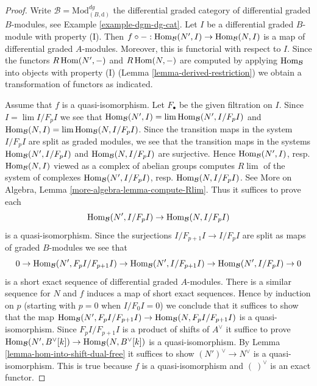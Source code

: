\begin{proof}
Write $\mathcal{B} = \text{Mod}^{dg}_{(B, \text{d})}$ the
differential graded category of differential graded $B$-modules, see
Example \ref{example-dgm-dg-cat}.
Let $I$ be a differential graded $B$-module with property (I).
Then $f \circ - : \mathop{\mathrm{Hom}}\nolimits_\mathcal{B}(N', I) \to \mathop{\mathrm{Hom}}\nolimits_\mathcal{B}(N, I)$
is a map of differential graded $A$-modules. Moreover, this is functorial
with respect to $I$. Since the functors
$ R\mathop{\mathrm{Hom}}\nolimits(N', -)$ and $R\mathop{\mathrm{Hom}}\nolimits(N, -)$ are
computed by applying $\mathop{\mathrm{Hom}}\nolimits_\mathcal{B}$ into objects with property (I)
(Lemma \ref{lemma-derived-restriction}) we obtain a transformation of functors
as indicated.

\medskip\noindent
Assume that $f$ is a quasi-isomorphism. Let $F_\bullet$ be the
given filtration on $I$. Since $I = \lim I/F_pI$ we see that
$\mathop{\mathrm{Hom}}\nolimits_\mathcal{B}(N', I) = \mathop{\mathrm{lim}}\nolimits \mathop{\mathrm{Hom}}\nolimits_\mathcal{B}(N', I/F_pI)$ and
$\mathop{\mathrm{Hom}}\nolimits_\mathcal{B}(N, I) = \mathop{\mathrm{lim}}\nolimits \mathop{\mathrm{Hom}}\nolimits_\mathcal{B}(N, I/F_pI)$.
Since the transition maps in the system $I/F_pI$ are split
as graded modules, we see that the transition maps in the
systems $\mathop{\mathrm{Hom}}\nolimits_\mathcal{B}(N', I/F_pI)$ and $\mathop{\mathrm{Hom}}\nolimits_\mathcal{B}(N, I/F_pI)$
are surjective. Hence $\mathop{\mathrm{Hom}}\nolimits_\mathcal{B}(N', I)$, resp. $\mathop{\mathrm{Hom}}\nolimits_\mathcal{B}(N, I)$
viewed as a complex of abelian groups computes $R\lim$ of the system
of complexes
$\mathop{\mathrm{Hom}}\nolimits_\mathcal{B}(N', I/F_pI)$, resp. $\mathop{\mathrm{Hom}}\nolimits_\mathcal{B}(N, I/F_pI)$.
See More on Algebra, Lemma \ref{more-algebra-lemma-compute-Rlim}.
Thus it suffices to prove each
$$
\mathop{\mathrm{Hom}}\nolimits_\mathcal{B}(N', I/F_pI) \to \mathop{\mathrm{Hom}}\nolimits_\mathcal{B}(N, I/F_pI)
$$
is a quasi-isomorphism. Since the surjections $I/F_{p + 1}I \to I/F_pI$
are split as maps of graded $B$-modules we see that
$$
0 \to \mathop{\mathrm{Hom}}\nolimits_\mathcal{B}(N', F_pI/F_{p + 1}I) \to
\mathop{\mathrm{Hom}}\nolimits_\mathcal{B}(N', I/F_{p + 1}I) \to
\mathop{\mathrm{Hom}}\nolimits_\mathcal{B}(N', I/F_pI) \to 0
$$
is a short exact sequence of differential graded $A$-modules.
There is a similar sequence for $N$ and $f$ induces a map
of short exact sequences. Hence by induction on $p$ (starting with $p = 0$
when $I/F_0I = 0$) we conclude that it suffices to show that
the map
$\mathop{\mathrm{Hom}}\nolimits_\mathcal{B}(N', F_pI/F_{p + 1}I) \to \mathop{\mathrm{Hom}}\nolimits_\mathcal{B}(N, F_pI/F_{p + 1}I)$
is a quasi-isomorphism. Since $F_pI/F_{p + 1}I$ is a product of shifts of
$A^\vee$ it suffice to prove
$\mathop{\mathrm{Hom}}\nolimits_\mathcal{B}(N', B^\vee[k]) \to \mathop{\mathrm{Hom}}\nolimits_\mathcal{B}(N, B^\vee[k])$
is a quasi-isomorphism. By Lemma \ref{lemma-hom-into-shift-dual-free}
it suffices to show $(N')^\vee \to N^\vee$ is a quasi-isomorphism.
This is true because $f$ is a quasi-isomorphism and $(\ )^\vee$
is an exact functor.
\end{proof}

